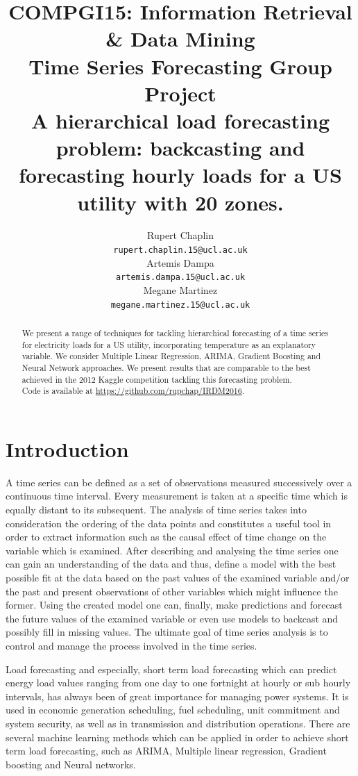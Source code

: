 \documentclass{article} %
\title{COMPGI15: Information Retrieval \& Data Mining \\
Time Series Forecasting Group Project \\
A hierarchical load forecasting problem: backcasting and forecasting hourly loads for a US utility with 20 zones.}
\author{
Rupert Chaplin\\
\texttt{rupert.chaplin.15@ucl.ac.uk} \\
\And
Artemis Dampa\\
\texttt{artemis.dampa.15@ucl.ac.uk} \\
\And
Megane Martinez\\
\texttt{megane.martinez.15@ucl.ac.uk} \\
}
\begin{document}
\maketitle

\begin{abstract}
We present a range of techniques for tackling hierarchical forecasting of a time series for electricity loads for a US utility, incorporating temperature as an explanatory variable.  We consider Multiple Linear Regression, ARIMA, Gradient Boosting and Neural Network approaches. We present results that are comparable to the best achieved in the 2012 Kaggle competition tackling this forecasting problem. \\
Code is available at \url{https://github.com/rupchap/IRDM2016}.
\end{abstract}

\section*{Introduction}
A time series can be defined as a set of observations measured successively over a continuous time interval. Every measurement is taken at a specific time which is equally distant to its subsequent. The analysis of time series takes into consideration the ordering of the data points and constitutes a useful tool in order to extract information such as the causal effect of time change on the variable which is examined. After describing and analysing the time series one can gain an understanding of the data and thus, define a model with the best possible fit at the data based on the past values of the examined variable and/or the past and present observations of other variables which might influence the former. Using the created model one can, finally, make predictions and forecast the future values of the examined variable or even use models to backcast and possibly fill in missing values. The ultimate goal of time series analysis is to control and manage the process involved in the time series.

Load forecasting and especially, short term load forecasting which can predict energy load values ranging from one day to one fortnight at hourly or sub hourly intervals, has always been of great importance for managing power systems. It is used in economic generation scheduling, fuel scheduling, unit commitment and system security, as well as in transmission and distribution operations. There are several machine learning methods which can be applied in order to achieve short term load forecasting, such as ARIMA, Multiple linear regression, Gradient boosting and Neural networks.
\end{document}
